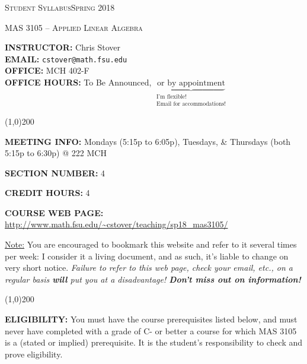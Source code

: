 \documentclass[12pt,oneside]{amsart}
\begin{document}
\centerline{\large\textsc{Student Syllabus\hspace{6mm}Spring 2018}}\vspace{1.5mm}
\centerline{\large\hfill\textsc{MAS 3105 -- Applied Linear Algebra}\hfill}\vspace{3mm}
 
\noindent \textbf{INSTRUCTOR:} Chris Stover\\[1.5mm]
\noindent \textbf{EMAIL:} \texttt{cstover@math.fsu.edu}\\[1.5mm]
\noindent \textbf{OFFICE:} MCH 402-F\\[1.5mm]
\noindent \textbf{OFFICE HOURS:} To Be Announced, $\underbrace{\text{or by appointment}}_{\substack{\text{I'm flexible!}\\\text{Email for accommodations!}}}$%

\begin{center}
	\line(1,0){200}
\end{center}

\noindent \textbf{MEETING INFO:} Mondays (5:15p to 6:05p), Tuesdays, \& Thursdays (both 5:15p to 6:30p) @ 222 MCH

\noindent \textbf{SECTION NUMBER:} 4%

\noindent \textbf{CREDIT HOURS:} 4

\noindent \textbf{COURSE WEB PAGE:} \url{http://www.math.fsu.edu/~cstover/teaching/sp18_mas3105/}%

\vspace{-3mm}
\ul{Note:} You are encouraged to bookmark this website and refer to it several times per week: I consider it a living document, and as such, it's liable to change on very short notice. \textit{Failure to refer to this web page, check your email, etc., on a regular basis \textbf{will} put you at a disadvantage! \textbf{Don't miss out on information!}}

\vspace{-6mm}
\begin{center}
	\line(1,0){200}
\end{center}

\noindent \textbf{ELIGIBILITY:} You must have the course prerequisites listed below, and must never have completed with a grade of C- or better a course for which MAS 3105 is a (stated or implied) prerequisite. It is the student's responsibility to check and prove eligibility.
\end{document}
